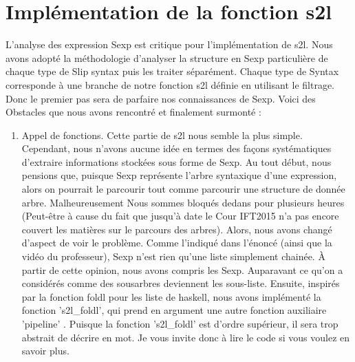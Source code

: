 \documentclass{article}
\begin{document}
\section{Implémentation de la fonction s2l}
L'analyse des expression Sexp est critique pour l'implémentation de s2l. Nous avons
adopté la méthodologie d'analyser la structure en Sexp particulière de chaque
type de Slip syntax puis les traiter séparément. Chaque type de Syntax corresponde à
une branche de notre fonction s2l définie en utilisant le filtrage. Donc le premier pas
sera de parfaire nos connaissances de Sexp. Voici des Obstacles que nous avons rencontré et finalement
surmonté : 
\begin{enumerate}
  \item Appel de fonctions. Cette partie de s2l nous semble la plus simple. Cependant, nous n'avons
  aucune idée en termes des façons systématiques d'extraire informations stockées sous forme de Sexp. Au tout début,
  nous pensions que, puisque Sexp représente l'arbre syntaxique d'une expression, alors on pourrait 
  le parcourir tout comme parcourir une structure de donnée arbre. Malheureusement Nous sommes bloqués 
  dedans pour plusieurs heures (Peut-être à cause du fait que jusqu'à date le Cour IFT2015 n'a pas encore
  couvert les matières sur le parcours des arbres). Alors, nous avons changé d'aspect de voir le problème.
  Comme l'indiqué dans l'énoncé (ainsi que la vidéo du professeur), Sexp n'est rien qu'une liste simplement 
  chainée. À partir de cette opinion, nous avons compris les Sexp. Auparavant ce qu'on a considérés comme
  des sousarbres deviennent les sous-liste. Ensuite, inspirés par la fonction foldl pour les liste de haskell,
  nous avons implémenté la fonction 's2l\_foldl', qui prend en argument une autre fonction auxiliaire 'pipeline'
  . Puisque la fonction 's2l\_foldl' est d'ordre supérieur, il sera trop abstrait de décrire en mot. Je vous
  invite donc à lire le code si vous voulez en savoir plus. 
  

\end{enumerate}
\end{document}
